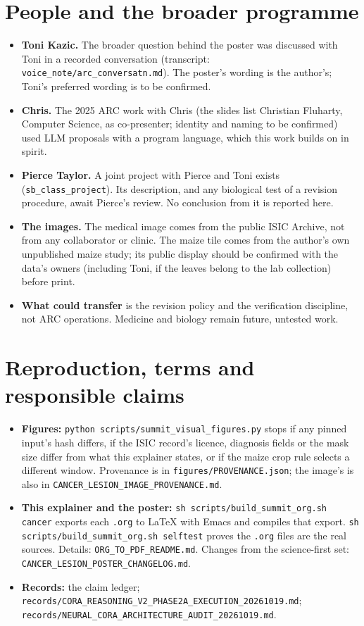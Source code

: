 \documentclass[11pt, a4paper]{article}
\begin{document}
\section{People and the broader programme}
\label{sec-people}
\begin{itemize}
\item \textbf{Toni Kazic.} The broader question behind the poster was discussed with Toni in a recorded conversation (transcript:
\texttt{voice\_note/arc\_conversatn.md}). The poster's wording is the author's; Toni's preferred wording is to be confirmed.
\item \textbf{Chris.} The 2025 ARC work with Chris (the slides list Christian Fluharty, Computer Science, as co-presenter;
identity and naming to be confirmed) used LLM proposals with a program language, which this work builds on in spirit.
\item \textbf{Pierce Taylor.} A joint project with Pierce and Toni exists (\texttt{sb\_class\_project}). Its description, and any biological
test of a revision procedure, await Pierce's review. No conclusion from it is reported here.
\item \textbf{The images.} The medical image comes from the public ISIC Archive, not from any collaborator or clinic. The maize
tile comes from the author's own unpublished maize study; its public display should be confirmed with the data's
owners (including Toni, if the leaves belong to the lab collection) before print.
\item \textbf{What could transfer} is the revision policy and the verification discipline, not ARC operations. Medicine and
biology remain future, untested work.
\end{itemize}

\section{Reproduction, terms and responsible claims}
\label{sec-repro}
\begin{itemize}
\item \textbf{Figures:} \texttt{python scripts/summit\_visual\_figures.py} stops if any pinned input's hash differs, if the ISIC record's
licence, diagnosis fields or the mask size differ from what this explainer states, or if the maize crop rule selects
a different window. Provenance is in
\texttt{figures/PROVENANCE.json}; the image's is also in \texttt{CANCER\_LESION\_IMAGE\_PROVENANCE.md}.
\item \textbf{This explainer and the poster:} \texttt{sh scripts/build\_summit\_org.sh cancer} exports each \texttt{.org} to \LaTeX{} with Emacs and
compiles that export. \texttt{sh scripts/build\_summit\_org.sh selftest} proves the \texttt{.org} files are the real sources. Details:
\texttt{ORG\_TO\_PDF\_README.md}. Changes from the science-first set: \texttt{CANCER\_LESION\_POSTER\_CHANGELOG.md}.
\item \textbf{Records:} the claim ledger; \texttt{records/CORA\_REASONING\_V2\_PHASE2A\_EXECUTION\_20261019.md};
\texttt{records/NEURAL\_CORA\_ARCHITECTURE\_AUDIT\_20261019.md}.
\end{itemize}
\end{document}
